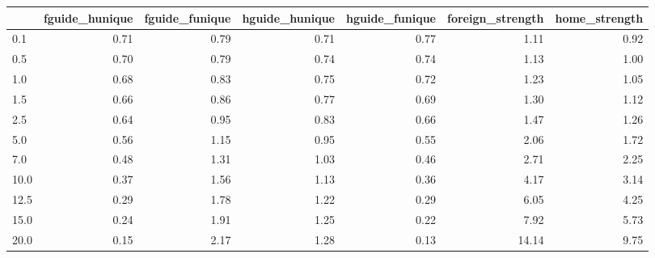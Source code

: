 \begin{tabular}{lrrrrrr}
\toprule
 & fguide_hunique & fguide_funique & hguide_hunique & hguide_funique & foreign_strength & home_strength \\
\midrule
0.1 & 0.71 & 0.79 & 0.71 & 0.77 & 1.11 & 0.92 \\
0.5 & 0.70 & 0.79 & 0.74 & 0.74 & 1.13 & 1.00 \\
1.0 & 0.68 & 0.83 & 0.75 & 0.72 & 1.23 & 1.05 \\
1.5 & 0.66 & 0.86 & 0.77 & 0.69 & 1.30 & 1.12 \\
2.5 & 0.64 & 0.95 & 0.83 & 0.66 & 1.47 & 1.26 \\
5.0 & 0.56 & 1.15 & 0.95 & 0.55 & 2.06 & 1.72 \\
7.0 & 0.48 & 1.31 & 1.03 & 0.46 & 2.71 & 2.25 \\
10.0 & 0.37 & 1.56 & 1.13 & 0.36 & 4.17 & 3.14 \\
12.5 & 0.29 & 1.78 & 1.22 & 0.29 & 6.05 & 4.25 \\
15.0 & 0.24 & 1.91 & 1.25 & 0.22 & 7.92 & 5.73 \\
20.0 & 0.15 & 2.17 & 1.28 & 0.13 & 14.14 & 9.75 \\
\bottomrule
\end{tabular}
